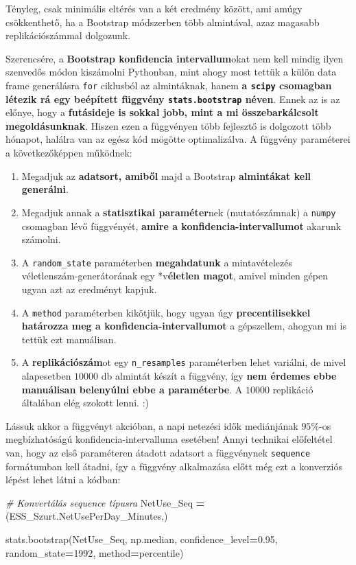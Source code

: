 \documentclass[
]{book}
\newenvironment{Shaded}{\begin{snugshade}}{\end{snugshade}}
\newcommand{\CommentTok}[1]{\textcolor[rgb]{0.56,0.35,0.01}{\textit{#1}}}
\newcommand{\DecValTok}[1]{\textcolor[rgb]{0.00,0.00,0.81}{#1}}
\newcommand{\FloatTok}[1]{\textcolor[rgb]{0.00,0.00,0.81}{#1}}
\newcommand{\NormalTok}[1]{#1}
\newcommand{\OperatorTok}[1]{\textcolor[rgb]{0.81,0.36,0.00}{\textbf{#1}}}
\newcommand{\StringTok}[1]{\textcolor[rgb]{0.31,0.60,0.02}{#1}}
\providecommand{\tightlist}{%
  \setlength{\itemsep}{0pt}\setlength{\parskip}{0pt}}
\begin{document}
Tényleg, csak minimális eltérés van a két eredmény között, ami amúgy csökkenthető, ha a Bootstrap módszerben több almintával, azaz magasabb replikációszámmal dolgozunk.

Szerencsére, a \textbf{Bootstrap konfidencia intervallum}okat nem kell mindig ilyen szenvedős módon kiszámolni Pythonban, mint ahogy most tettük a külön data frame generálásra \texttt{for} ciklusból az almintáknak, hanem \textbf{a \texttt{scipy} csomagban létezik rá egy beépített függvény \texttt{stats.bootstrap} néven}. Ennek az is az előnye, hogy a \textbf{futásideje is sokkal jobb, mint a mi összebarkálcsolt megoldásunknak}. Hiszen ezen a függvényen több fejlesztő is dolgozott több hónapot, halálra van az egész kód mögötte optimalizálva. A függvény paraméterei a következőképpen működnek:

\begin{enumerate}
\def\labelenumi{\arabic{enumi}.}
\tightlist
\item
  Megadjuk az \textbf{adatsort, amiből} majd a Bootstrap \textbf{almintákat kell generálni}.
\item
  Megadjuk annak a \textbf{statisztikai paraméter}nek (mutatószámnak) a \texttt{numpy} csomagban lévő függvényét, \textbf{amire a konfidencia-intervallumot} akarunk számolni.
\item
  A \texttt{random\_state} paraméterben \textbf{megahdatunk} a mintavételezés véletlenszám-generátorának egy *v\textbf{életlen magot}, amivel minden gépen ugyan azt az eredményt kapjuk.
\item
  A \texttt{method} paraméterben kikötjük, hogy ugyan úgy \textbf{precentilisekkel határozza meg a konfidencia-intervallumot} a gépszellem, ahogyan mi is tettük ezt manuálisan.
\item
  A \textbf{replikációszám}ot egy \texttt{n\_resamples} paraméterben lehet variálni, de mivel alapesetben \(10000\) db almintát készít a függvény, így \textbf{nem érdemes ebbe manuálisan belenyúlni ebbe a paraméterbe}. A \(10000\) replikáció általában elég szokott lenni. :)
\end{enumerate}

Lássuk akkor a függvényt akcióban, a napi netezési idők mediánjának \(95\%\)-os megbízhatóságú konfidencia-intervalluma esetében!
Annyi technikai előfeltétel van, hogy az első paraméteren átadott adatsort a függvénynek \texttt{sequence} formátumban kell átadni, így a függvény alkalmazása előtt még ezt a konverziós lépést lehet látni a kódban:

\begin{Shaded}
\begin{Highlighting}[]
\CommentTok{\# Konvertálás sequence típusra}
\NormalTok{NetUse\_Seq }\OperatorTok{=}\NormalTok{ (ESS\_Szurt.NetUsePerDay\_Minutes,)}

\NormalTok{stats.bootstrap(NetUse\_Seq, np.median, confidence\_level}\OperatorTok{=}\FloatTok{0.95}\NormalTok{,}
\NormalTok{                         random\_state}\OperatorTok{=}\DecValTok{1992}\NormalTok{, method}\OperatorTok{=}\StringTok{\textquotesingle{}percentile\textquotesingle{}}\NormalTok{)}
\end{Highlighting}
\end{Shaded}
\end{document}
